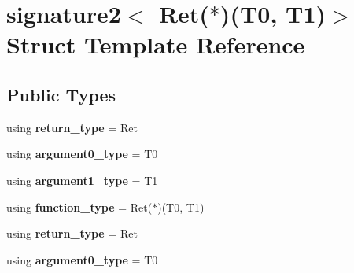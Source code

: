 \hypertarget{structsignature2_3_01Ret_07_5_08_07T0_00_01T1_08_4}{}\section{signature2$<$ Ret($\ast$)(T0, T1)$>$ Struct Template Reference}
\label{structsignature2_3_01Ret_07_5_08_07T0_00_01T1_08_4}
\subsection*{Public Types}
\begin{DoxyCompactItemize}
\item 
using {\bfseries return\+\_\+type} = Ret\hypertarget{structsignature2_3_01Ret_07_5_08_07T0_00_01T1_08_4_a6e84fbcff2ab3119aedd79366ebef25d}{}\label{structsignature2_3_01Ret_07_5_08_07T0_00_01T1_08_4_a6e84fbcff2ab3119aedd79366ebef25d}

\item 
using {\bfseries argument0\+\_\+type} = T0\hypertarget{structsignature2_3_01Ret_07_5_08_07T0_00_01T1_08_4_abd59972766ed2b0448e65b1e89cfc6c2}{}\label{structsignature2_3_01Ret_07_5_08_07T0_00_01T1_08_4_abd59972766ed2b0448e65b1e89cfc6c2}

\item 
using {\bfseries argument1\+\_\+type} = T1\hypertarget{structsignature2_3_01Ret_07_5_08_07T0_00_01T1_08_4_ad31d2d55ab91ed56888f73e03e1f80fb}{}\label{structsignature2_3_01Ret_07_5_08_07T0_00_01T1_08_4_ad31d2d55ab91ed56888f73e03e1f80fb}

\item 
using {\bfseries function\+\_\+type} = Ret($\ast$)(T0, T1)\hypertarget{structsignature2_3_01Ret_07_5_08_07T0_00_01T1_08_4_ab59f15b060e6a6701aa736a35b14cc56}{}\label{structsignature2_3_01Ret_07_5_08_07T0_00_01T1_08_4_ab59f15b060e6a6701aa736a35b14cc56}

\item 
using {\bfseries return\+\_\+type} = Ret\hypertarget{structsignature2_3_01Ret_07_5_08_07T0_00_01T1_08_4_a6e84fbcff2ab3119aedd79366ebef25d}{}\label{structsignature2_3_01Ret_07_5_08_07T0_00_01T1_08_4_a6e84fbcff2ab3119aedd79366ebef25d}

\item 
using {\bfseries argument0\+\_\+type} = T0\hypertarget{structsignature2_3_01Ret_07_5_08_07T0_00_01T1_08_4_abd59972766ed2b0448e65b1e89cfc6c2}{}\label{structsignature2_3_01Ret_07_5_08_07T0_00_01T1_08_4_abd59972766ed2b0448e65b1e89cfc6c2}


\end{DoxyCompactItemize}
